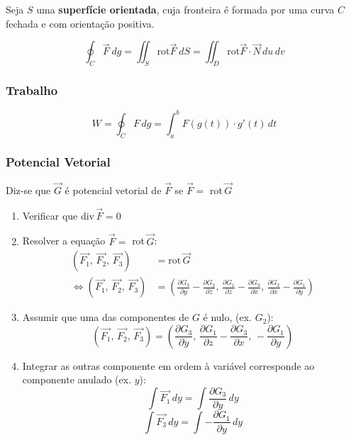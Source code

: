 \documentclass[11pt, a4paper]{article}
\begin{document}
Seja $S$ uma \textbf{superfície orientada}, cuja fronteira é formada por uma
curva $C$ fechada e com orientação positiva.

\begin{equation*}
    \oint_C \vec{F} \ dg =
    \iint_S \text{rot} \vec{F} \ dS =
    \iint_D \text{rot} \vec{F} \cdot \vec{N} \, du\,dv
\end{equation*}

\subsubsection{Trabalho}
\begin{equation*}
    W = \oint_C F \, dg =
    \int_{a}^{b} F\left(g(t)\right) \cdot g'(t) \, dt
\end{equation*}

\subsubsection{Potencial Vetorial}

Diz-se que $\vec{G}$ é potencial vetorial de $\vec{F}$ se $\vec{F} =$ rot\,$\vec{G}$

\begin{enumerate}
    \item Verificar que div\,$\vec{F} = 0$
    \item Resolver a equação $\vec{F} =$ rot\,$\vec{G}$:
          \begin{align*}
              \left(\vec{F_1},\,\vec{F_2},\,\vec{F_3}\right) & = \text{rot}\,\vec{G}
              \\ \Leftrightarrow
              \left(\vec{F_1},\,\vec{F_2},\,\vec{F_3}\right) & =
              \left(\frac{\partial G_3}{\partial y} - \frac{\partial G_2}{\partial z}
              ,\,\frac{\partial G_1}{\partial z} - \frac{\partial G_3}{\partial x}
              ,\,\frac{\partial G_2}{\partial x} - \frac{\partial G_1}{\partial y}
              \right)
          \end{align*}
    \item Assumir que uma das componentes de $G$ é nulo, (ex. $G_2$):
          \begin{equation*}
              \left(\vec{F_1},\,\vec{F_2},\,\vec{F_3}\right) =
              \left(\frac{\partial G_3}{\partial y}
              ,\,\frac{\partial G_1}{\partial z} - \frac{\partial G_3}{\partial x}
              ,\, - \frac{\partial G_1}{\partial y}
              \right)
          \end{equation*}
    \item Integrar as outras componente em ordem à variável corresponde ao
          componente anulado (ex. $y$):
          \begin{equation*}
              \int \vec{F_1} \,dy = \int \frac{\partial G_3}{\partial y} \,dy
          \end{equation*}
          \begin{equation*}
              \int \vec{F_3} \,dy = \int -\frac{\partial G_1}{\partial y} \,dy
          \end{equation*}
\end{enumerate}
\end{document}
